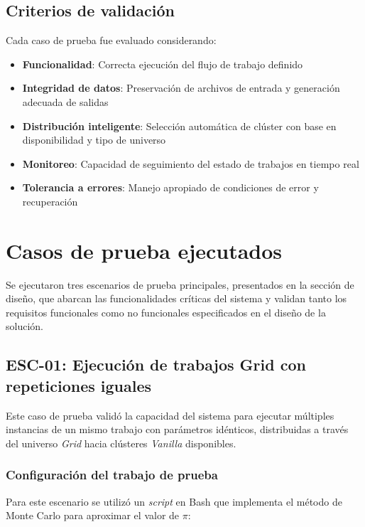 \subsection{Criterios de validación}
\noindent

Cada caso de prueba fue evaluado considerando:

\begin{itemize}
	\item \textbf{Funcionalidad}: Correcta ejecución del flujo de trabajo definido
	\item \textbf{Integridad de datos}: Preservación de archivos de entrada y generación adecuada de salidas
	\item \textbf{Distribución inteligente}: Selección automática de clúster con base en disponibilidad y tipo de universo
	\item \textbf{Monitoreo}: Capacidad de seguimiento del estado de trabajos en tiempo real
	\item \textbf{Tolerancia a errores}: Manejo apropiado de condiciones de error y recuperación
\end{itemize}

\section{Casos de prueba ejecutados}
\noindent

Se ejecutaron tres escenarios de prueba principales, presentados en la sección de diseño, que abarcan las funcionalidades críticas del sistema y validan tanto los requisitos funcionales como no funcionales especificados en el diseño de la solución.

\subsection{ESC-01: Ejecución de trabajos Grid con repeticiones iguales}
\noindent

Este caso de prueba validó la capacidad del sistema para ejecutar múltiples instancias de un mismo trabajo con parámetros idénticos, distribuidas a través del universo \textit{Grid} hacia clústeres \textit{Vanilla} disponibles.

\subsubsection{Configuración del trabajo de prueba}
\noindent

Para este escenario se utilizó un \textit{script} en Bash que implementa el método de Monte Carlo para aproximar el valor de $\pi$:

